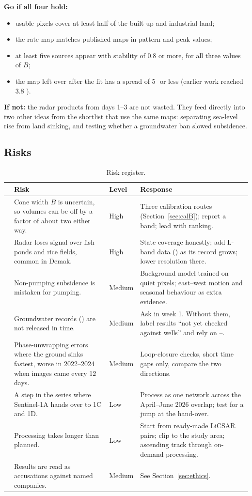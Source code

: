\textbf{Go if all four hold:}
\begin{itemize}
\item usable pixels cover at least half of the built-up and industrial land;
\item the rate map matches published maps in pattern and peak values;
\item at least five sources appear with stability of 0.8 or more, for all three values of $B$;
\item the map left over after the fit has a spread of 5\,\mmyr\ or less (earlier work reached 3.8
\cite{azeriansyah2025}).
\end{itemize}

\textbf{If not:} the radar products from days 1--3 are not wasted. They feed directly into two other
ideas from the shortlist that use the same maps: separating sea-level rise from land sinking, and
testing whether a groundwater ban slowed subsidence.

\subsection{Risks}

{\small
\begin{xltabular}{\linewidth}{@{}L{8mm}L{40mm}L{14mm}Y@{}}
\caption{Risk register.}\label{tab:risk}\\*
\toprule
 & \textbf{Risk} & \textbf{Level} & \textbf{Response}\\*
\midrule
{} & Cone width $B$ is uncertain, so volumes can be off by a factor of about two either way. & High &
  Three calibration routes (Section~\ref{sec:calB}); report a band; lead with ranking.\\
 & Radar loses signal over fish ponds and rice fields, common in Demak. & High & State coverage
  honestly; add L-band data () as its record grows; lower resolution there.\\
 & Non-pumping subsidence is mistaken for pumping. & Medium & Background model  trained on quiet
  pixels; east--west motion and seasonal behaviour as extra evidence.\\
 & Groundwater records () are not released in time. & Medium & Ask in week 1. Without them, label
  results ``not yet checked against wells'' and rely on --.\\
 & Phase-unwrapping errors where the ground sinks fastest, worse in 2022--2024 when images came every
  12 days. & Medium & Loop-closure checks, short time gaps only, compare the two directions.\\
 & A step in the series where Sentinel-1A hands over to 1C and 1D. & Low & Process as one network across
  the April--June 2026 overlap; test for a jump at the hand-over.\\
 & Processing takes longer than planned. & Low & Start from ready-made LiCSAR pairs; clip to the study
  area; ascending track through on-demand processing.\\
 & Results are read as accusations against named companies. & Medium & See Section~\ref{sec:ethics}.\\
\bottomrule
\end{xltabular}}

